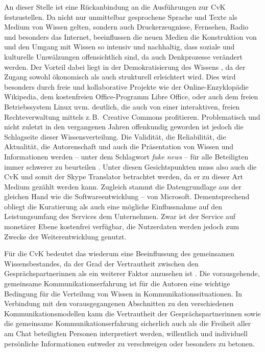 An dieser Stelle ist eine Rückanbindung an die Ausführungen zur CvK festzustellen. Da nicht nur unmittelbar gesprochene Sprache und Texte als Medium von Wissen gelten, sondern auch Druckerzeugnisse, Fernsehen, Radio und besonders das Internet, \glqq beeinflussen die neuen Medien die Konstruktion von und den Umgang mit Wissen so intensiv und nachhaltig, dass soziale und kulturelle Umwälzungen offensichtlich sind, da auch Denkprozesse verändert werden.\grqq{} \citep[345]{janich_textlinguistik_2019} Der Vorteil dabei liegt in der \glqq Demokratisierung des Wissens\grqq{} \citep[348]{janich_textlinguistik_2019}, da der Zugang sowohl ökonomisch als auch strukturell erleichtert wird. Dies wird besonders durch freie und kollaborative Projekte wie der Online-Enzyklopädie Wikipedia, dem kostenfreien Office-Programm Libre Office, oder auch dem freien Betriebssystem Linux uvm. deutlich, die auch von einer interaktiven, freien Rechteverwaltung mittels z.\,B.\ Creative Commons profitieren. Problematisch und nicht zuletzt in den vergangenen Jahren offenkundig geworden ist jedoch die Schlagseite dieser Wissensverteilung. Die Validität, die Reliabilität, die Aktualität, die Autorenschaft und auch die Präsentation von Wissen und Informationen werden -- unter dem Schlagwort \emph{fake news} -- für alle Beteiligten immer schwerer zu beurteilen \citep[348]{janich_textlinguistik_2019}. Unter diesen Gesichtspunkten muss also auch die CvK und somit der Skype Translator betrachtet werden, da er zu dieser Art Medium gezählt werden kann. Zugleich stammt die Datengrundlage aus der gleichen Hand wie die Softwareentwicklung -- von Microsoft. Dementsprechend obliegt die Kuratierung als auch eine mögliche Einflussnahme auf den Leistungsumfang des Services dem Unternehmen. Zwar ist der Service auf monetärer Ebene kostenfrei verfügbar, die Nutzerdaten werden jedoch zum Zwecke der Weiterentwicklung genutzt.

Für die CvK bedeutet das wiederum eine Beeinflussung des gemeinsamen Wissensbestandes, da der Grad der Vertrautheit zwischen den Gesprächspartner{\textperiodcentered}\linebreak[3]innen als ein weiterer Faktor anzusehen ist \citep[7]{koch_gesprochene_2011}. Die vorausgehende, gemeinsame \glqq Kommunikationserfahrung\grqq{} \citep[7]{koch_gesprochene_2011} ist für die Autoren eine wichtige Bedingung für die Verteilung von Wissen in Kommunikationssituationen. In Verbindung mit den vorausgegangenen Abschnitten zu den verschiedenen Kommunikationsmodellen kann die Vertrautheit der Gesprächspartner{\textperiodcentered}innen sowie die gemeinsame Kommunikationserfahrung sicherlich auch als die Freiheit aller am Chat beteiligten Personen interpretiert werden, willentlich und individuell persönliche Informationen entweder zu verschweigen oder besonders zu betonen.


